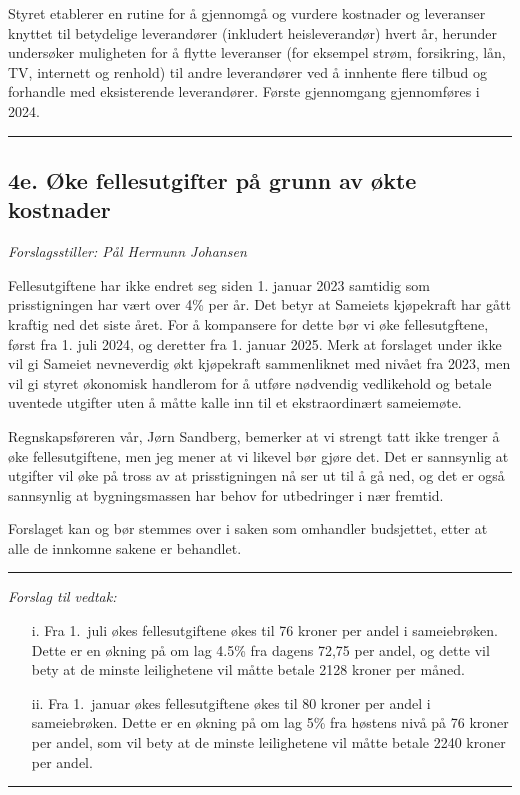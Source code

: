 \documentclass[12pt]{article}
\begin{document}
Styret etablerer en rutine for å gjennomgå og vurdere kostnader og leveranser knyttet til
betydelige leverandører (inkludert heisleverandør) hvert år, herunder undersøker muligheten for å
flytte leveranser (for eksempel strøm, forsikring, lån, TV, internett og renhold) til andre
leverandører ved å innhente flere tilbud og forhandle med eksisterende leverandører. Første
gjennomgang gjennomføres i 2024.\\
{\rule{\textwidth}{0.3pt}}

\subsection*{4e. Øke fellesutgifter på grunn av økte kostnader}

{\em Forslagsstiller: Pål Hermunn Johansen}

Fellesutgiftene har ikke endret seg siden 1. januar 2023 samtidig som prisstigningen har vært over
4\% per år. Det betyr at Sameiets kjøpekraft har gått kraftig ned det siste året. For å kompansere
for dette bør vi øke fellesutgftene, først fra 1. juli 2024, og deretter fra 1. januar 2025. Merk
at forslaget under ikke vil gi Sameiet nevneverdig økt kjøpekraft sammenliknet med nivået fra 2023,
men vil gi styret økonomisk handlerom for å utføre nødvendig vedlikehold og betale uventede
utgifter uten å måtte kalle inn til et ekstraordinært sameiemøte.

Regnskapsføreren vår, Jørn Sandberg, bemerker at vi strengt tatt ikke trenger å øke
fellesutgiftene, men jeg mener at vi likevel bør gjøre det. Det er sannsynlig at utgifter vil øke
på tross av at prisstigningen nå ser ut til å gå ned, og det er også sannsynlig at bygningsmassen
har behov for utbedringer i nær fremtid.

Forslaget kan og bør stemmes over i saken som omhandler budsjettet, etter at alle de innkomne
sakene er behandlet.

{\rule{\textwidth}{0.3pt}}

{\em Forslag til vedtak:}
\begin{enumerate}
\item[i.]Fra 1.\ juli økes fellesutgiftene økes til 76 kroner per andel i sameiebrøken. Dette er en
  økning på om lag 4.5\% fra dagens 72,75 per andel, og dette vil bety at de minste leilighetene
  vil måtte betale 2128 kroner per måned.
\item[ii.]Fra 1.\ januar økes fellesutgiftene økes til 80 kroner per andel i sameiebrøken. Dette er
  en økning på om lag 5\% fra høstens nivå på 76 kroner per andel, som vil bety at de minste
  leilighetene vil måtte betale 2240 kroner per andel.
\end{enumerate}
{\rule{\textwidth}{0.3pt}}
\end{document}
